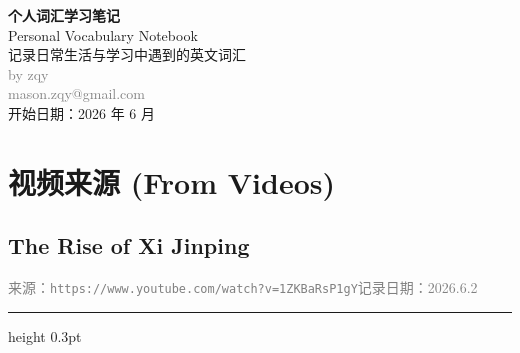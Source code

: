 \documentclass[12pt, a4paper]{article}
\newcommand{\vocabsource}[3]{%
  \subsection*{\textcolor{sourcecolor}{#1}}%
  \noindent\textcolor{gray}{\small 来源：\texttt{#2}\hfill 记录日期：#3}%
  \par\vspace{4pt}\hrule height 0.3pt\vspace{8pt}%
}
\begin{document}
\begin{titlepage}
  \centering\vspace*{4cm}
  {\Huge\bfseries\color{headerblue} 个人词汇学习笔记}\\[0.5cm]
  {\Large Personal Vocabulary Notebook}\\[2cm]
  {\large 记录日常生活与学习中遇到的英文词汇}\\[2cm]
  {\large\textcolor{gray}{by zqy}}\\[0.5cm]
  {\large\textcolor{gray}{mason.zqy@gmail.com}}\\[3cm]
  \vfill
  {\large 开始日期：2026 年 6 月}
\end{titlepage}

\tableofcontents
\newpage

\section{视频来源 (From Videos)}

\vocabsource{The Rise of Xi Jinping}{https://www.youtube.com/watch?v=1ZKBaRsP1gY}{2026.6.2}
\end{document}
